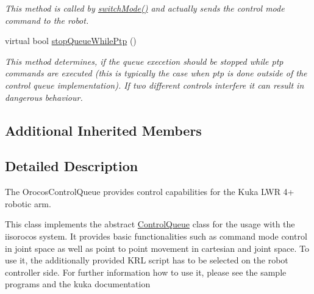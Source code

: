 \begin{DoxyCompactItemize}
\begin{DoxyCompactList}\small\item\em This method is called by \hyperlink{classkukadu_1_1PlottingControlQueue_ace69c9adaff27b5d98a42e70f7bc64ff}{switch\-Mode()} and actually sends the control mode command to the robot. \end{DoxyCompactList}\item 
virtual bool \hyperlink{classkukadu_1_1PlottingControlQueue_a8e686e1dadfb0039e2510270c9a3d330}{stop\-Queue\-While\-Ptp} ()
\begin{DoxyCompactList}\small\item\em This method determines, if the queue execetion should be stopped while ptp commands are executed (this is typically the case when ptp is done outside of the control queue implementation). If two different controls interfere it can result in dangerous behaviour. \end{DoxyCompactList}\end{DoxyCompactItemize}
\subsection*{Additional Inherited Members}


\subsection{Detailed Description}
The Orocos\-Control\-Queue provides control capabilities for the Kuka L\-W\-R 4+ robotic arm. 

This class implements the abstract \hyperlink{classkukadu_1_1ControlQueue}{Control\-Queue} class for the usage with the iisorocos system. It provides basic functionalities such as command mode control in joint space as well as point to point movement in cartesian and joint space. To use it, the additionally provided K\-R\-L script has to be selected on the robot controller side. For further information how to use it, please see the sample programs and the kuka documentation 

